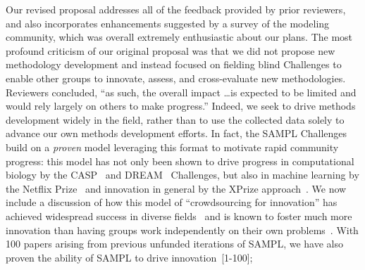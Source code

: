 \documentclass[11pt]{article}
\begin{document}
Our revised proposal addresses all of the feedback provided by prior reviewers, and also incorporates enhancements suggested by a survey of the modeling community, which was overall extremely enthusiastic about our plans.
The most profound criticism of our original proposal was that we did not propose new methodology development and instead focused on fielding blind Challenges to enable other groups to innovate, assess, and cross-evaluate new methodologies.
Reviewers concluded, ``as such, the overall impact \ldots is expected to be limited and would rely largely on others to make progress.''
Indeed, we seek to drive methods development widely in the field, rather than to use the collected data solely to advance our own methods development efforts.
In fact, the SAMPL Challenges build on a \emph{proven} model leveraging this format to motivate rapid community progress: this model has not only been shown to drive progress in computational biology by the CASP~\cite{Moult:2014:Proteins, Monastyrskyy:2016:Proteins, Moult:2016:Proteins} and DREAM~\cite{Prill:2011:Sci.Signal., Eisenstein:2013:NatBiotech, Saez-Rodriguez:2016:NatRevGenet} Challenges, but also in machine learning by the Netflix Prize~\cite{Bell:2010:CHANCE} and innovation in general by the XPrize approach~\cite{::XPRIZE, Kay:2011:R&DManage, XPrize:2017:Wikipedia}. 
We now include a discussion of how this model of ``crowdsourcing for innovation'' has achieved widespread success in diverse fields~\cite{Kay:2011:R&DManage, Saez-Rodriguez:2016:NatRevGenet} and is known to foster much more innovation than having groups work independently on their own problems~\cite{Bell:2010:CHANCE, Kay:2011:R&DManage, Saez-Rodriguez:2016:NatRevGenet}.
With 100 papers arising from previous unfunded iterations of SAMPL, we have also proven the ability of SAMPL to drive innovation~[1-100];
\end{document}
